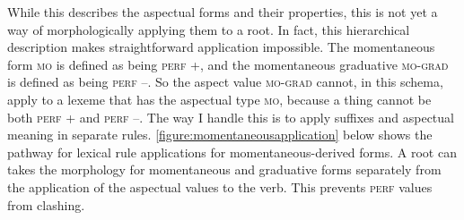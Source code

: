 \begin{figure}[H]
\begin{footnotesize}
\end{footnotesize}
\end{figure}


While this describes the aspectual forms and their properties, this is not yet a way of morphologically applying them to a root. In fact, this hierarchical description makes straightforward application impossible. The momentaneous form \textsc{mo} is defined as being \textsc{perf} +, and the momentaneous graduative \textsc{mo-grad} is defined as being \textsc{perf} --. So the aspect value \textsc{mo-grad} cannot, in this schema, apply to a lexeme that has the aspectual type \textsc{mo}, because a thing cannot be both \textsc{perf} + and \textsc{perf} --. The way I handle this is to apply suffixes and aspectual meaning in separate rules. \cref{figure:momentaneousapplication} below shows the pathway for lexical rule applications for momentaneous-derived forms. A root can takes the morphology for momentaneous and graduative forms separately from the application of the aspectual values to the verb. This prevents \textsc{perf} values from clashing.

